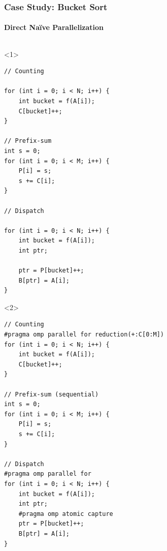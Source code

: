 \documentclass[xcolor={x11names,svgnames},x11names,svgnames]{beamer}
\begin{document}

\begin{frame}[fragile,label=radix_code]
  \frametitle{Case Study: Bucket Sort}
  \framesubtitle{Direct Naïve Parallelization}

    \begin{columns}[c]
    \begin{column}{.6\textwidth}

\begin{onlyenv}<1>
\begin{verbatim}
// Counting

for (int i = 0; i < N; i++) {
    int bucket = f(A[i]);
    C[bucket]++;
}

// Prefix-sum
int s = 0;
for (int i = 0; i < M; i++) {
    P[i] = s;
    s += C[i];
}

// Dispatch

for (int i = 0; i < N; i++) {
    int bucket = f(A[i]);
    int ptr;

    ptr = P[bucket]++;
    B[ptr] = A[i];
}
\end{verbatim}
\end{onlyenv}
%
\begin{onlyenv}<2>
\begin{verbatim}
// Counting
#pragma omp parallel for reduction(+:C[0:M])
for (int i = 0; i < N; i++) {
    int bucket = f(A[i]);
    C[bucket]++;
}

// Prefix-sum (sequential)
int s = 0;
for (int i = 0; i < M; i++) {
    P[i] = s;
    s += C[i];
}

// Dispatch
#pragma omp parallel for
for (int i = 0; i < N; i++) {
    int bucket = f(A[i]);
    int ptr;
    #pragma omp atomic capture
    ptr = P[bucket]++;
    B[ptr] = A[i];
}
\end{verbatim}
\end{onlyenv}

\end{column}

    \begin{column}{.4\textwidth}

\end{column}
\end{columns}
\end{frame}
\end{document}
